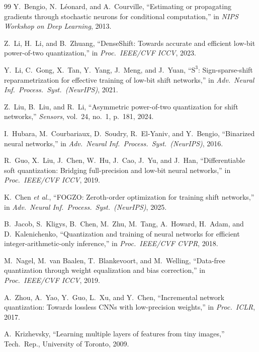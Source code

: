 \documentclass[12pt]{article}
\begin{document}
\begin{thebibliography}{99}
Y.\ Bengio, N.\ L\'{e}onard, and A.\ Courville,
``Estimating or propagating gradients through stochastic neurons for conditional computation,''
in \textit{NIPS Workshop on Deep Learning}, 2013.

Z.\ Li, H.\ Li, and B.\ Zhuang,
``DenseShift: Towards accurate and efficient low-bit power-of-two quantization,''
in \textit{Proc.\ IEEE/CVF ICCV}, 2023.

Y.\ Li, C.\ Gong, X.\ Tan, Y.\ Yang, J.\ Meng, and J.\ Yuan,
``$\text{S}^3$: Sign-sparse-shift reparametrization for effective training of low-bit shift networks,''
in \textit{Adv.\ Neural Inf.\ Process.\ Syst.\ (NeurIPS)}, 2021.

Z.\ Liu, B.\ Liu, and R.\ Li,
``Asymmetric power-of-two quantization for shift networks,''
\textit{Sensors}, vol.\ 24, no.\ 1, p.\ 181, 2024.

I.\ Hubara, M.\ Courbariaux, D.\ Soudry, R.\ El-Yaniv, and Y.\ Bengio,
``Binarized neural networks,''
in \textit{Adv.\ Neural Inf.\ Process.\ Syst.\ (NeurIPS)}, 2016.

R.\ Guo, X.\ Liu, J.\ Chen, W.\ Hu, J.\ Cao, J.\ Yu, and J.\ Han,
``Differentiable soft quantization: Bridging full-precision and low-bit neural networks,''
in \textit{Proc.\ IEEE/CVF ICCV}, 2019.

K.\ Chen \textit{et al.},
``FOGZO: Zeroth-order optimization for training shift networks,''
in \textit{Adv.\ Neural Inf.\ Process.\ Syst.\ (NeurIPS)}, 2025.

B.\ Jacob, S.\ Kligys, B.\ Chen, M.\ Zhu, M.\ Tang, A.\ Howard, H.\ Adam, and D.\ Kalenichenko,
``Quantization and training of neural networks for efficient integer-arithmetic-only inference,''
in \textit{Proc.\ IEEE/CVF CVPR}, 2018.

M.\ Nagel, M.\ van Baalen, T.\ Blankevoort, and M.\ Welling,
``Data-free quantization through weight equalization and bias correction,''
in \textit{Proc.\ IEEE/CVF ICCV}, 2019.

A.\ Zhou, A.\ Yao, Y.\ Guo, L.\ Xu, and Y.\ Chen,
``Incremental network quantization: Towards lossless CNNs with low-precision weights,''
in \textit{Proc.\ ICLR}, 2017.

A.\ Krizhevsky,
``Learning multiple layers of features from tiny images,''
Tech.\ Rep., University of Toronto, 2009.


\end{thebibliography}
\end{document}
